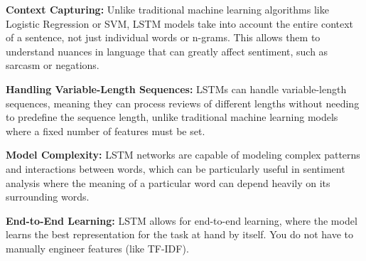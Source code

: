 \documentclass[11pt]{article}
\begin{document}
\textbf{Context Capturing:} Unlike traditional machine learning
algorithms like Logistic Regression or SVM, LSTM models take into
account the entire context of a sentence, not just individual words or
n-grams. This allows them to understand nuances in language that can
greatly affect sentiment, such as sarcasm or negations.

\textbf{Handling Variable-Length Sequences:} LSTMs can handle
variable-length sequences, meaning they can process reviews of different
lengths without needing to predefine the sequence length, unlike
traditional machine learning models where a fixed number of features
must be set.

\textbf{Model Complexity:} LSTM networks are capable of modeling complex
patterns and interactions between words, which can be particularly
useful in sentiment analysis where the meaning of a particular word can
depend heavily on its surrounding words.

\textbf{End-to-End Learning:} LSTM allows for end-to-end learning, where
the model learns the best representation for the task at hand by itself.
You do not have to manually engineer features (like TF-IDF).
\end{document}
